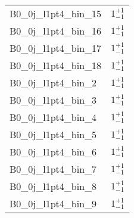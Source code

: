 \begin{tabular}{|l|c|}
B0\_0j\_l1pt4\_bin\_15 & $1^{+1}_{-1}$ \\
B0\_0j\_l1pt4\_bin\_16 & $1^{+1}_{-1}$ \\
B0\_0j\_l1pt4\_bin\_17 & $1^{+1}_{-1}$ \\
B0\_0j\_l1pt4\_bin\_18 & $1^{+1}_{-1}$ \\
B0\_0j\_l1pt4\_bin\_2 & $1^{+1}_{-1}$ \\
B0\_0j\_l1pt4\_bin\_3 & $1^{+1}_{-1}$ \\
B0\_0j\_l1pt4\_bin\_4 & $1^{+1}_{-1}$ \\
B0\_0j\_l1pt4\_bin\_5 & $1^{+1}_{-1}$ \\
B0\_0j\_l1pt4\_bin\_6 & $1^{+1}_{-1}$ \\
B0\_0j\_l1pt4\_bin\_7 & $1^{+1}_{-1}$ \\
B0\_0j\_l1pt4\_bin\_8 & $1^{+1}_{-1}$ \\
B0\_0j\_l1pt4\_bin\_9 & $1^{+1}_{-1}$ \\
\hline
\end{tabular}

